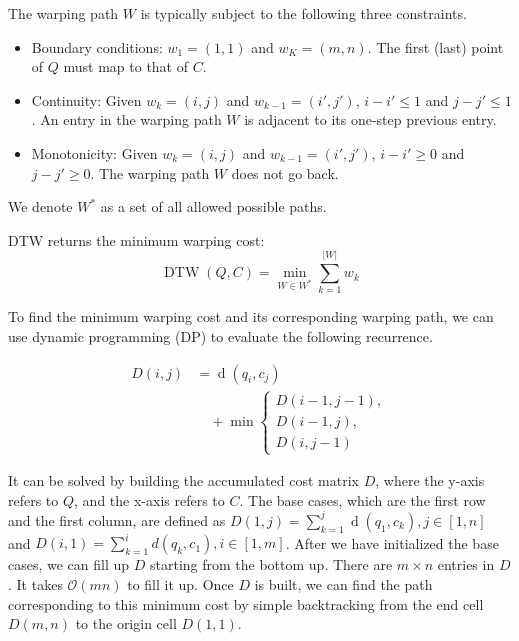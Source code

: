 The warping path $W$ is typically subject to the following three constraints.
\begin{itemize}
  \item Boundary conditions: $w_1 = (1, 1)$ and $w_K = (m, n)$. The first (last) point of $Q$ must map to that of $C$.
  \item Continuity: Given $w_k = (i, j)$ and $w_{k-1} = (i', j')$, $i - i' \leq 1$ and $j - j' \leq 1$. An entry in the warping path $W$ is adjacent to its one-step previous entry.  
  \item Monotonicity: Given $w_k = (i, j)$ and $w_{k-1} = (i', j')$, $i - i' \geq 0$ and $j - j' \geq 0$. The warping path $W$ does not go back. 
\end{itemize}
We denote $W^*$ as a set of all allowed possible paths.

\begin{definition}
    \label{def:dtw}
    DTW returns the minimum warping cost:
    \begin{equation} 
        \label{eq:dtw}
        \operatorname{DTW}(Q, C) = \min_{W \in W^*}{\sum_{k=1}^{|W|} w_k}
    \end{equation}
\end{definition}
To find the minimum warping cost and its corresponding warping path, we can use dynamic programming (DP) to evaluate the following recurrence.

\begin{equation}
\label{eq:dtw-recurrence}
\begin{split}
    D(i, j) &= \operatorname{d}(q_i, c_j) \\
    &\quad + \min \begin{cases}
        D(i-1, j-1), \\
        D(i-1, j), \\
        D(i, j-1)
    \end{cases}
\end{split}
\end{equation}

It can be solved by building the accumulated cost matrix $D$, where the y-axis refers to $Q$, and the x-axis refers to $C$.
The base cases, which are the first row and the first column, are defined as $D(1, j) = \sum_{k=1}^{j} \operatorname{d}(q_1, c_k), j \in [1, n]$ and $D(i, 1) = \sum_{k=1}^{i} d(q_k, c_1), i \in [1, m]$. 
After we have initialized the base cases, we can fill up $D$ starting from the bottom up.
There are $m \times n$ entries in $D$. It takes $\mathcal{O}(mn)$ to fill it up.
Once $D$ is built, we can find the path corresponding to this minimum cost by simple backtracking from the end cell $D(m, n)$ to the origin cell $D(1, 1)$.

